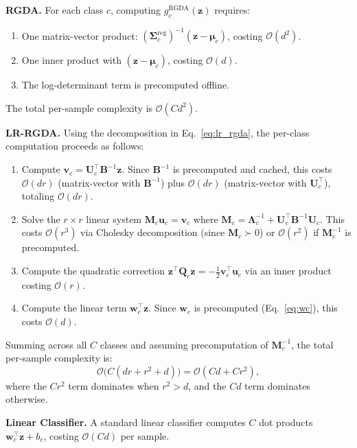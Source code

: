 \documentclass{article}
\begin{document}
\textbf{RGDA.} For each class $c$, computing $g_c^{\text{RGDA}}(\mathbf{z})$ requires:
\begin{enumerate}
    \item One matrix-vector product: $(\mathbf{\Sigma}_c^{\text{reg}})^{-1} (\mathbf{z} - \boldsymbol{\mu}_c)$, costing $\mathcal{O}(d^2)$.
    \item One inner product with $(\mathbf{z} - \boldsymbol{\mu}_c)$, costing $\mathcal{O}(d)$.
    \item The log-determinant term is precomputed offline.
\end{enumerate}
The total per-sample complexity is $\mathcal{O}(Cd^2)$.

\textbf{LR-RGDA.} Using the decomposition in Eq.~\eqref{eq:lr_rgda}, the per-class computation proceeds as follows:
\begin{enumerate}
    \item Compute $\mathbf{v}_c = \mathbf{U}_c^\top \mathbf{B}^{-1} \mathbf{z}$. Since $\mathbf{B}^{-1}$ is precomputed and cached, this costs $\mathcal{O}(dr)$ (matrix-vector with $\mathbf{B}^{-1}$) plus $\mathcal{O}(dr)$ (matrix-vector with $\mathbf{U}_c^\top$), totaling $\mathcal{O}(dr)$.
    \item Solve the $r \times r$ linear system $\mathbf{M}_c \mathbf{u}_c = \mathbf{v}_c$ where $\mathbf{M}_c = \boldsymbol{\Lambda}_c^{-1} + \mathbf{U}_c^\top \mathbf{B}^{-1} \mathbf{U}_c$. This costs $\mathcal{O}(r^3)$ via Cholesky decomposition (since $\mathbf{M}_c \succ 0$) or $\mathcal{O}(r^2)$ if $\mathbf{M}_c^{-1}$ is precomputed.
    \item Compute the quadratic correction $\mathbf{z}^\top \mathbf{Q}_c \mathbf{z} = -\frac{1}{2} \mathbf{v}_c^\top \mathbf{u}_c$ via an inner product costing $\mathcal{O}(r)$.
    \item Compute the linear term $\mathbf{w}_c^\top \mathbf{z}$. Since $\mathbf{w}_c$ is precomputed (Eq.~\eqref{eq:wc}), this costs $\mathcal{O}(d)$.
\end{enumerate}
Summing across all $C$ classes and assuming precomputation of $\mathbf{M}_c^{-1}$, the total per-sample complexity is:
\begin{equation}
    \mathcal{O}\big(C(dr + r^2 + d)\big) = \mathcal{O}(Cd + Cr^2),
\end{equation}
where the $Cr^2$ term dominates when $r^2 > d$, and the $Cd$ term dominates otherwise.

\textbf{Linear Classifier.} A standard linear classifier computes $C$ dot products $\mathbf{w}_c^\top \mathbf{z} + b_c$, costing $\mathcal{O}(Cd)$ per sample.
\end{document}
